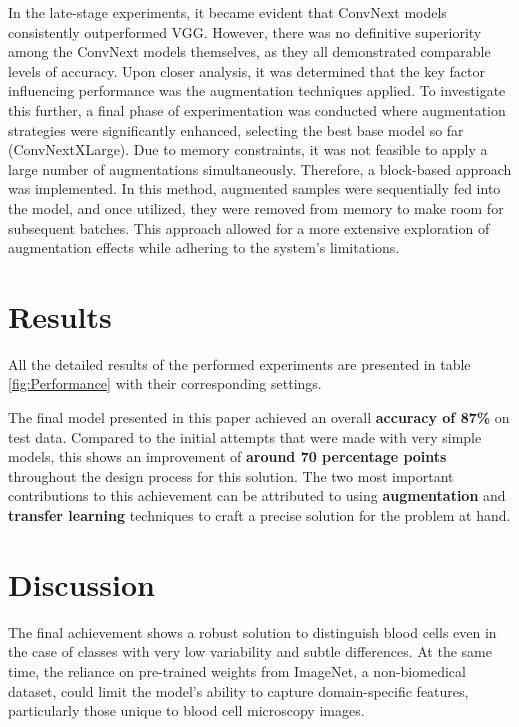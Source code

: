 \documentclass[10pt]{article}
\begin{document}
\begin{multicols}{2}
         In the late-stage experiments, it became evident that ConvNext models consistently outperformed VGG. However, there was no definitive superiority among the ConvNext models themselves, as they all demonstrated comparable levels of accuracy. Upon closer analysis, it was determined that the key factor influencing performance was the augmentation techniques applied.
         To investigate this further, a final phase of experimentation was conducted where augmentation strategies were significantly enhanced, selecting the best base model so far (ConvNextXLarge). Due to memory constraints, it was not feasible to apply a large number of augmentations simultaneously. Therefore, a block-based approach was implemented. In this method, augmented samples were sequentially fed into the model, and once utilized, they were removed from memory to make room for subsequent batches. This approach allowed for a more extensive exploration of augmentation effects while adhering to the system's limitations. %
        
        
    \section{Results}

        All the detailed results of the performed experiments are presented in table \ref{fig:Performance} with their corresponding settings.
        

		The final model presented in this paper achieved an overall \textbf{accuracy of 87\%}
        on test data. Compared to the initial attempts that were made with very simple models, this shows an improvement of \textbf{around 70 percentage points} throughout the design process for this solution. The two most important contributions to this achievement can be attributed to using \textbf{augmentation} and \textbf{transfer learning} techniques to craft a precise solution for the problem at hand.

         
        
    \section{Discussion}
        The final achievement shows a robust solution to distinguish blood cells even in the case of classes with very low variability and subtle differences. At the same time, the reliance on pre-trained weights from ImageNet, a non-biomedical dataset, could limit the model's ability to capture domain-specific features, particularly those unique to blood cell microscopy images. 


\end{multicols}
\end{document}
